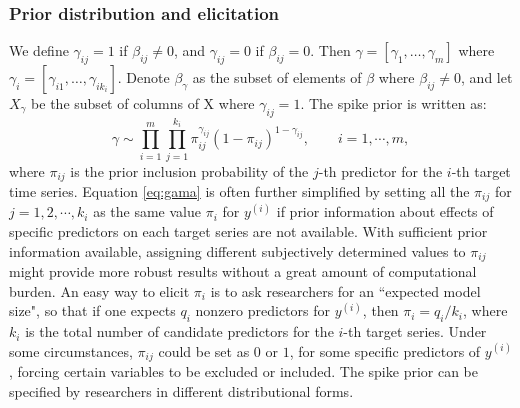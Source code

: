 \documentclass[twoside,11pt]{article}
\begin{document}
\subsubsection{Prior distribution and elicitation}

 We define $\gamma_{ij}=1$ if $\beta_{ij}\ne0$, and  $\gamma_{ij}=0$ if $\beta_{ij}=0$. Then $\gamma=[\gamma_1,\dots,\gamma_m]$ where $\gamma_i=[\gamma_{i1},\dots,\gamma_{ik_i}]$. Denote  $\beta_{\gamma}$ as the subset of elements of $\beta$ where $\beta_{ij}\ne 0$, and let $X_\gamma$ be the subset of columns of X where $\gamma_{ij}=1$.
The spike prior is written as:
\begin{equation} \label{eq:gama}
\gamma\sim\prod_{i=1}^{m}\prod_{j=1}^{k_i}\pi_{ij}^{\gamma_{ij}}(1-\pi_{ij})^{1-\gamma_{ij}},\quad\quad i=1,\cdots, m,
\end{equation}
where $\pi_{ij}$ is the prior inclusion probability of the $j$-th predictor for the $i$-th target time series. Equation \eqref{eq:gama} is often further simplified by setting all the $\pi_{ij}$ for $j=1,2,\cdots,k_i$ as the same value $\pi_i$ for $y^{(i)}$ if prior information about effects of specific predictors on each target series are not available. With sufficient prior information available, assigning different subjectively determined values to $\pi_{ij}$ might provide more robust results without a great amount of computational burden. An easy way to elicit $\pi_i$ is to ask researchers for an ``expected model size", so that if one expects $q_i$ nonzero predictors for $y^{(i)}$, then $\pi_i=q_i/k_i$, where $k_i$ is the total number of candidate predictors for the $i$-th target series. Under some circumstances, $\pi_{ij}$ could be set as $0$ or $1$, for some specific predictors of $y^{(i)}$, forcing certain variables to be excluded or included. The spike prior can be specified by researchers in different distributional forms.
\end{document}

